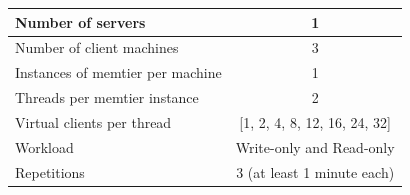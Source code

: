 \documentclass[11pt,a4paper]{article}
\begin{document}
\begin{center}
	\scriptsize{
		\begin{tabular}{|l|c|}
			\hline Number of servers                & 1                        \\ 
			\hline Number of client machines        & 3                        \\ 
			\hline Instances of memtier per machine & 1                        \\ 
			\hline Threads per memtier instance     & 2                        \\
			\hline Virtual clients per thread       & [1, 2, 4, 8, 12, 16, 24, 32]\\ 
			\hline Workload                         & Write-only and Read-only \\
			\hline Repetitions                      & 3 (at least 1 minute each)\\ 
			\hline 
		\end{tabular}
	}
\end{center}
\end{document}

